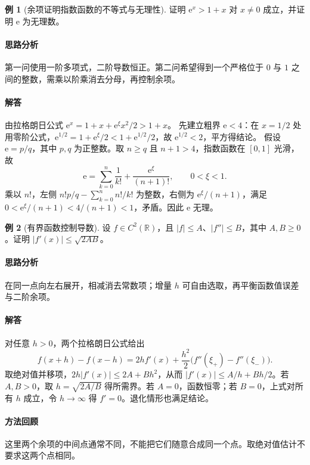\documentclass[UTF8,fontset=fandol,12pt,oneside,openany]{ctexrep}
\newcommand{\R}{\mathbb R}
\newcommand{\ee}{\mathrm e}
\theoremstyle{definition}
\newtheorem{example}{例}[chapter]
\begin{document}
\begin{example}[余项证明指数函数的不等式与无理性]证明 $\ee^x>1+x$ 对 $x\ne0$ 成立，并证明 $\ee$ 为无理数。\end{example}
\paragraph{思路分析}第一问使用一阶多项式，二阶导数恒正。第二问希望得到一个严格位于 $0$ 与 $1$ 之间的整数，需乘以阶乘消去分母，再控制余项。
\paragraph{解答}由拉格朗日公式 $\ee^x=1+x+\ee^\xi x^2/2>1+x$。
先建立粗界 $\ee<4$：在 $x=1/2$ 处用零阶公式，$\ee^{1/2}=1+\ee^\xi/2<1+\ee^{1/2}/2$，故 $\ee^{1/2}<2$，平方得结论。
假设 $\ee=p/q$，其中 $p,q$ 为正整数。取 $n\ge q$ 且 $n+1>4$，指数函数在 $[0,1]$ 光滑，故
\[
\ee=\sum_{k=0}^n\frac1{k!}+\frac{\ee^\xi}{(n+1)!},\qquad0<\xi<1.
\]
乘以 $n!$，左侧 $n!p/q-\sum_{k=0}^nn!/k!$ 为整数，右侧为 $\ee^\xi/(n+1)$，满足 $0<\ee^\xi/(n+1)<4/(n+1)<1$，矛盾。因此 $\ee$ 无理。

\begin{example}[有界函数控制导数]设 $f\in C^2(\R)$，且 $|f|\le A$、$|f''|\le B$，其中 $A,B\ge0$。证明 $|f'(x)|\le\sqrt{2AB}$。\end{example}
\paragraph{思路分析}在同一点向左右展开，相减消去常数项；增量 $h$ 可自由选取，再平衡函数值误差与二阶余项。
\paragraph{解答}对任意 $h>0$，两个拉格朗日公式给出
\[
f(x+h)-f(x-h)=2hf'(x)+\frac{h^2}2\bigl(f''(\xi_+)-f''(\xi_-)\bigr).
\]
取绝对值并移项，$2h|f'(x)|\le2A+Bh^2$，从而 $|f'(x)|\le A/h+Bh/2$。若 $A,B>0$，取 $h=\sqrt{2A/B}$ 得所需界。若 $A=0$，函数恒零；若 $B=0$，上式对所有 $h$ 成立，令 $h\to\infty$ 得 $f'=0$。退化情形也满足结论。
\paragraph{方法回顾}这里两个余项的中间点通常不同，不能把它们随意合成同一个点。取绝对值估计不要求这两个点相同。
\end{document}
